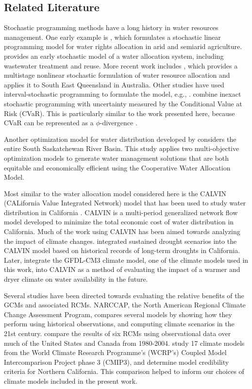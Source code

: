 \documentclass[opre,nonblindrev]{informs3} %
\begin{document}
\subsection{Related Literature}

Stochastic programming methods have a long history in water resources management.
One early example is \cite{hall1970optimal}, which formulates a stochastic linear programming model for water rights allocation in arid and semiarid agriculture.
\cite{bishop1975optimization} provides an early stochastic model of a water allocation system, including wastewater treatment and reuse.
More recent work includes \cite{higgins2008stochastic}, which provides a multistage nonlinear stochastic formulation of water resource allocation and applies it to South East Queensland in Australia.
Other studies have used interval-stochastic programming to formulate the model, e.g., \cite{li2009multistage}.
\cite{shao2011conditional} combine inexact stochastic programming with uncertainty measured by the Conditional Value at Risk (CVaR).
This is particularly similar to the work presented here, because CVaR can be represented as a $\phi$-divergence \citep{love2013phi}.

Another optimization model for water distribution developed by \cite{wang2008basin} considers the entire South Saskatchewan River Basin.
This study applies two multi-objective optimization models to generate water management solutions that are both equitable and economically efficient using the Cooperative Water Allocation Model.

Most similar to the water allocation model considered here is the CALVIN (CALifornia Value Integrated Network) model that has been used to study water distribution in California \citep{jenkins2004optimization}.
CALVIN is a multi-period generalized network flow model developed to minimize the total economic cost of water distribution in California.
Much of the work using CALVIN has been aimed towards analyzing the impact of climate changes.
\cite{harou2010economic} integrated sustained drought scenarios into the CALVIN model based on historical records of long-term droughts in California.
Later, \cite{connell2011adapting} integrate the GFDL-CM3 climate model, one of the climate models used in this work, into CALVIN as a method of evaluating the impact of a warmer and dryer climate on water availability in the future.

Several studies have been directed towards evaluating the relative benefits of the GCMs and associated RCMs.
NARCCAP, the North American Regional Climate Change Assessment Program, compares several models by showing how they perform using historical observations, and computing climate scenarios in the 21st century.
\cite{mearns2012north} compare the results of six RCMs using observational data over much of the United States and Canada from 1980-2004.
\cite{brekke2008significance} study 17 climate models from the World Climate Research Programme's (WCRP's) Coupled Model Intercomparison Project
phase 3 (CMIP3), and determine model credibility criteria for Northern California.
This comparison helped to inform our choices of climate models included in the present work.
\end{document}
